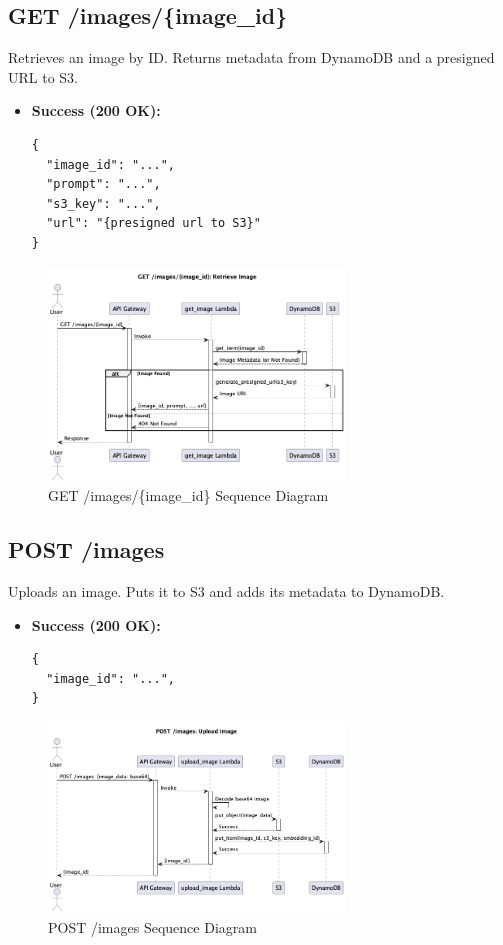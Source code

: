\documentclass{article}
\begin{document}
\subsection{GET /images/\{image\_id\}}
Retrieves an image by ID. Returns metadata from DynamoDB and a presigned URL to S3.

\begin{itemize}[noitemsep,topsep=0pt,parsep=0pt,partopsep=0pt]
    \item \textbf{Success (200 OK):}
 \begin{lstlisting}
{
  "image_id": "...",
  "prompt": "...",
  "s3_key": "...",
  "url": "{presigned url to S3}"
}
\end{lstlisting}
\end{itemize}

\begin{figure}[h!]
    \centering
    \includegraphics[width=0.7\textwidth]{uml/get_image.png} %
    \caption{GET /images/\{image\_id\} Sequence Diagram}
\end{figure}

\subsection{POST /images}
Uploads an image. Puts it to S3 and adds its metadata to DynamoDB.

\begin{itemize}[noitemsep,topsep=0pt,parsep=0pt,partopsep=0pt]
    \item \textbf{Success (200 OK):}
     \begin{lstlisting}
{
  "image_id": "...",
}
\end{lstlisting}
\end{itemize}

\begin{figure}[h!]
    \centering
    \includegraphics[width=0.7\textwidth]{uml/upload_image.png}%
    \caption{POST /images Sequence Diagram}
\end{figure}
\end{document}
